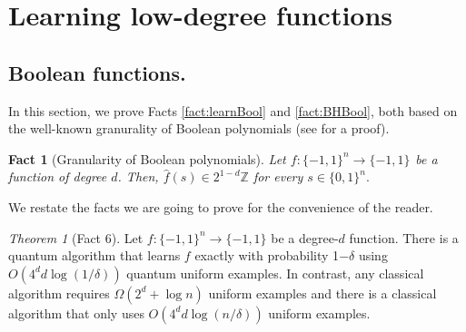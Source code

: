 \documentclass[11pt]{article}
\theoremstyle{plain}
\newtheorem{fact}[theorem]{Fact}
\newcommand{\pmset}[1]{\{-1,1\}^{#1}} %
\theoremstyle{plain}
\theoremstyle{definition}
\theoremstyle{remark}
\theoremstyle{named}
\newtheorem*{namedtheorem}{Theorem}
\begin{document}
\section{Learning low-degree functions}





\subsection{Boolean functions.} 
In this section, we prove Facts \ref{fact:learnBool} and \ref{fact:BHBool}, both based on the well-known granurality of Boolean polynomials (see \cite[Exercise 1.11]{o2014analysis} for a proof). 

\begin{fact}[Granularity of Boolean polynomials]\label{fact:granularity}
    Let $f:\{-1,1\}^n\to \pmset{}$ be a function of degree $d$. Then, $\widehat f(s)\in 2^{1-d}\mathbb Z$ for every $s \in\{0,1\}^n.$ 
\end{fact} 
\noindent We restate the facts we are going to prove for the convenience of the reader. 
\begin{namedtheorem}[Fact 6]
Let $f:\{-1,1\}^n\to\{-1,1\}$ be a degree-$d$ function. There is a quantum algorithm that learns $f$ exactly  with probability 1$-\delta$ using $O\left(4^dd\log\left(1/\delta\right)\right)$ quantum uniform examples. In contrast, any classical algorithm requires $\Omega(2^d+\log n)$ uniform examples and there is a classical algorithm that only uses $O\left(4^dd\log\left(n/\delta\right)\right)$ uniform examples.
\end{namedtheorem}
\end{document}
